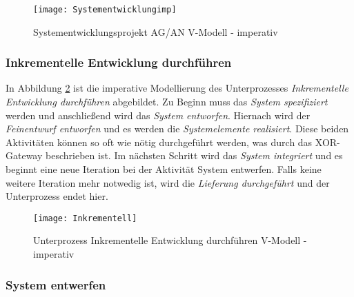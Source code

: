 \begin{figure}[!htbp]
\begin{center}
  \texttt{[image: Systementwicklungimp]} %
  \caption{Systementwicklungsprojekt AG/AN  V-Modell - imperativ}
  \label{fig:Systementwicklungimp}
\end{center}
\end{figure}




\subsubsection{Inkrementelle Entwicklung durchführen}
In Abbildung \ref{fig:Inkrementell} ist die imperative Modellierung des Unterprozesses \textit{Inkrementelle Entwicklung durchführen} abgebildet. \newline
Zu Beginn muss das \textit{System spezifiziert} werden und anschließend wird das \textit{System entworfen}. \newline
Hiernach wird der \textit{Feinentwurf entworfen} und es werden die \textit{Systemelemente realisiert}. Diese beiden Aktivitäten können so oft wie nötig durchgeführt werden, was durch das XOR-Gateway beschrieben ist.  \newline
Im nächsten Schritt wird das \textit{System integriert} und es beginnt eine neue Iteration bei der Aktivität System entwerfen.\newline
Falls keine weitere Iteration mehr notwedig ist, wird die \textit{Lieferung durchgeführt} und der Unterprozess endet hier. \newline

\begin{figure}[!htbp]
\begin{center}
  \texttt{[image: Inkrementell]} %
  \caption{Unterprozess Inkrementelle Entwicklung durchführen V-Modell - imperativ}
  \label{fig:Inkrementell}
\end{center}
\end{figure}



\clearpage


\subsubsection{System entwerfen}

